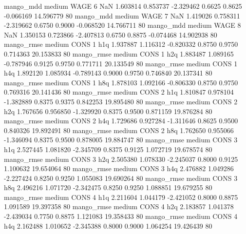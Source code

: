         mango_mdd     medium     WAGE                 6                  NaN  1.603814 0.853737 -2.329462 0.6625 0.8625 -0.066169   14.596779 80
        mango_mdd     medium     WAGE                 7                  NaN  1.419026 0.758311 -2.319662 0.6750 0.9000 -0.068520   14.766711 80
        mango_mdd     medium     WAGE                 8                  NaN  1.350153 0.723866 -2.407813 0.6750 0.8875 -0.074468   14.902938 80
       mango_rmse     medium     CONS                 1                  h1q  1.937887 1.116312 -0.820332 0.8750 0.9750  0.714363   20.153833 80
       mango_rmse     medium     CONS                 1                  h2q  1.883487 1.089165 -0.787946 0.9125 0.9750  0.771711   20.133549 80
       mango_rmse     medium     CONS                 1                  h4q  1.892120 1.085934 -0.789143 0.9000 0.9750  0.746840   20.137341 80
       mango_rmse     medium     CONS                 1                  h8q  1.878103 1.092166 -0.806330 0.8750 0.9750  0.769316   20.141436 80
       mango_rmse     medium     CONS                 2                  h1q  1.810847 0.978104 -1.382889 0.8375 0.9375  0.842253   19.895480 80
       mango_rmse     medium     CONS                 2                  h2q  1.767656 0.956850 -1.329920 0.8375 0.9500  0.871159   19.876284 80
       mango_rmse     medium     CONS                 2                  h4q  1.729686 0.927284 -1.311646 0.8625 0.9500  0.840326   19.892491 80
       mango_rmse     medium     CONS                 2                  h8q  1.762650 0.955066 -1.346094 0.8375 0.9500  0.878005   19.884747 80
       mango_rmse     medium     CONS                 3                  h1q  2.527445 1.081820 -2.345709 0.8375 0.9125  1.072719   19.678574 80
       mango_rmse     medium     CONS                 3                  h2q  2.505380 1.078330 -2.245037 0.8000 0.9125  1.100632   19.654064 80
       mango_rmse     medium     CONS                 3                  h4q  2.476882 1.049286 -2.227424 0.8250 0.9250  1.055083   19.690264 80
       mango_rmse     medium     CONS                 3                  h8q  2.496216 1.071720 -2.342475 0.8250 0.9250  1.088851   19.679255 80
       mango_rmse     medium     CONS                 4                  h1q  2.211604 1.044179 -2.421052 0.8000 0.8875  1.091589   19.397358 80
       mango_rmse     medium     CONS                 4                  h2q  2.183857 1.041378 -2.439034 0.7750 0.8875  1.121083   19.358433 80
       mango_rmse     medium     CONS                 4                  h4q  2.162488 1.010652 -2.345388 0.8000 0.9000  1.064254   19.426439 80
